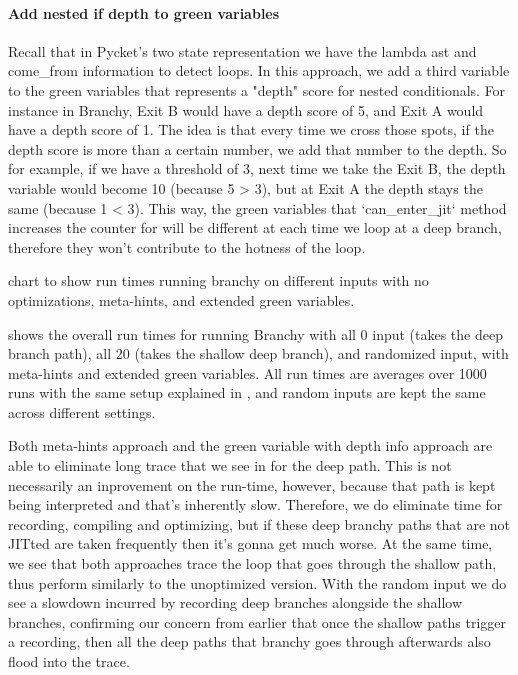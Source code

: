     \begin{paragraph-here}%
      \paragraph{Add nested if depth to green variables} Recall that in Pycket's two state representation we have the lambda ast and come\_from information to detect loops. In this approach, we add a third variable to the green variables that represents a "depth" score for nested conditionals. For instance in Branchy, Exit B would have a depth score of 5, and Exit A would have a depth score of 1. The idea is that every time we cross those spots, if the depth score is more than a certain number, we add that number to the depth. So for example, if we have a threshold of 3, next time we take the Exit B, the depth variable would become 10 (because 5 > 3), but at Exit A the depth stays the same (because 1 < 3). This way, the green variables that `can\_enter\_jit` method increases the counter for will be different at each time we loop at a deep branch, therefore they won't contribute to the hotness of the loop.
    \end{paragraph-here}

    \begin{figure-here}
      chart to show run times running branchy on different inputs with no optimizations, meta-hints, and extended green variables.
    \end{figure-here}

    \begin{paragraph-here}%
      \figref{} shows the overall run times for running Branchy with all 0 input (takes the deep branch path), all 20 (takes the shallow deep branch), and randomized input, with meta-hints and extended green variables. All run times are averages over 1000 runs with the same setup explained in , and random inputs are kept the same across different settings.
    \end{paragraph-here}

    \begin{paragraph-here}%
      Both meta-hints approach and the green variable with depth info approach are able to eliminate long trace that we see in  for the deep path. This is not necessarily an inprovement on the run-time, however, because that path is kept being interpreted and that's inherently slow. Therefore, we do eliminate time for recording, compiling and optimizing, but if these deep branchy paths that are not JITted are taken frequently then it's gonna get much worse. At the same time, we see that both approaches trace the loop that goes through the shallow path, thus perform similarly to the unoptimized version. With the random input we do see a slowdown incurred by recording deep branches alongside the shallow branches, confirming our concern from earlier that once the shallow paths trigger a recording, then all the deep paths that branchy goes through afterwards also flood into the trace.
    \end{paragraph-here}

